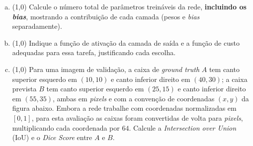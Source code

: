 \documentclass[11pt,a4paper]{article}
\begin{document}
\begin{enumerate}[1)]
\begin{enumerate}[a)]
    \item (1{,}0) Calcule o número total de parâmetros treináveis da rede, \textbf{incluindo os \textit{bias}}, mostrando a contribuição de cada camada (pesos e \textit{bias} separadamente).
    \vspace{3cm}

    \item (1{,}0) Indique a função de ativação da camada de saída e a função de custo adequadas para essa tarefa, justificando cada escolha.
    \vspace{3cm}

    \item (1{,}0) Para uma imagem de validação, a caixa de \textit{ground truth} $A$ tem canto superior esquerdo em $(10, 10)$ e canto inferior direito em $(40, 30)$; a caixa prevista $B$ tem canto superior esquerdo em $(25, 15)$ e canto inferior direito em $(55, 35)$, ambas em \textit{pixels} e com a convenção de coordenadas $(x, y)$ da figura abaixo. Embora a rede trabalhe com coordenadas normalizadas em $[0, 1]$, para esta avaliação as caixas foram convertidas de volta para \textit{pixels}, multiplicando cada coordenada por $64$. Calcule a \textit{Intersection over Union} (IoU) e o \textit{Dice Score} entre $A$ e $B$.

    \begin{center}
    \end{center}
    \vspace{3cm}
\end{enumerate}

\end{enumerate}
\end{document}
